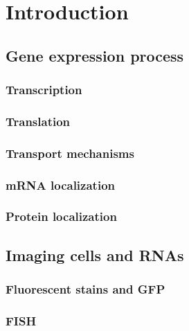 
\graphicspath{{../../figures/introduction/}}


\chapter{Introduction} \label{chap:introduction}

\minitoc
\newpage


\section{Gene expression process}


\subsection{Transcription}

\subsection{Translation}

\subsection{Transport mechanisms}

\subsection{\ac{mRNA} localization}


\subsection{Protein localization}


\section{Imaging cells and \ac{RNA}s}


\subsection{Fluorescent stains and \ac{GFP}}

\subsection{\ac{FISH}}

